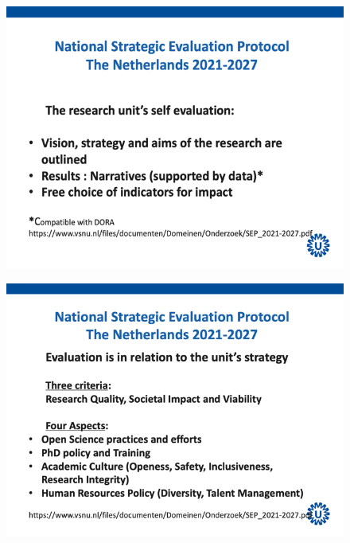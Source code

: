 \documentclass{jote-book}
\begin{document}
	\begin{figure}
		\includegraphics[width=\linewidth]{media/image5.png}

		\caption{}

		\label{fig:rId20}


	\end{figure}
	\begin{figure}
		\includegraphics[width=\linewidth]{media/image6.png}

		\caption{}

		\label{fig:rId21}


	\end{figure}
\end{document}
